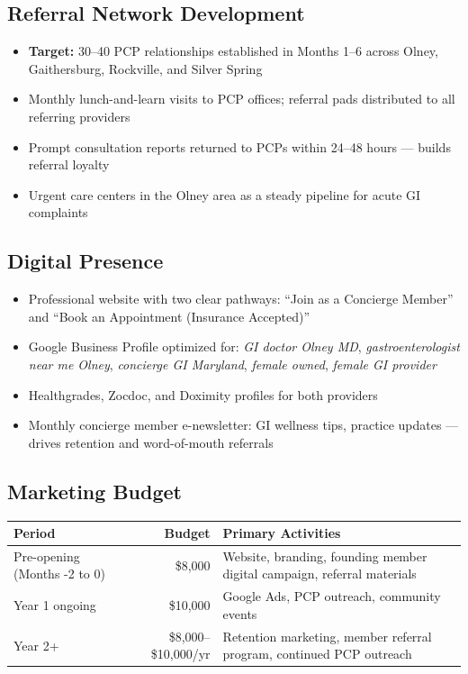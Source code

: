 \documentclass[11pt,letterpaper]{article}
\newcommand{\thead}[1]{\cellcolor{navy}\color{white}\bfseries\small #1}
\newcommand{\trow}{\rowcolor{rowshade}}
\begin{document}
\subsection{Referral Network Development}

\begin{itemize}
  \item \textbf{Target:} 30--40 PCP relationships established in Months 1--6 across Olney, Gaithersburg, Rockville, and Silver Spring
  \item Monthly lunch-and-learn visits to PCP offices; referral pads distributed to all referring providers
  \item Prompt consultation reports returned to PCPs within 24--48 hours --- builds referral loyalty
  \item Urgent care centers in the Olney area as a steady pipeline for acute GI complaints
\end{itemize}

\subsection{Digital Presence}

\begin{itemize}
  \item Professional website with two clear pathways: ``Join as a Concierge Member'' and ``Book an Appointment (Insurance Accepted)''
  \item Google Business Profile optimized for: \textit{GI doctor Olney MD}, \textit{gastroenterologist near me Olney}, \textit{concierge GI Maryland}, \textit{female owned}, \textit{female GI provider}
  \item Healthgrades, Zocdoc, and Doximity profiles for both providers
  \item Monthly concierge member e-newsletter: GI wellness tips, practice updates --- drives retention and word-of-mouth referrals
\end{itemize}

\subsection{Marketing Budget}

\vspace{6pt}
\begin{tabularx}{\linewidth}{|>{\small}l|>{\small}r|>{\small}X|}
\hline
\thead{Period} & \thead{Budget} & \thead{Primary Activities} \\
\hline
\trow Pre-opening (Months -2 to 0) & \$8,000 & Website, branding, founding member digital campaign, referral materials \\
Year 1 ongoing & \$10,000 & Google Ads, PCP outreach, community events \\
\trow Year 2+ & \$8,000--\$10,000/yr & Retention marketing, member referral program, continued PCP outreach \\
\hline
\end{tabularx}
\end{document}
